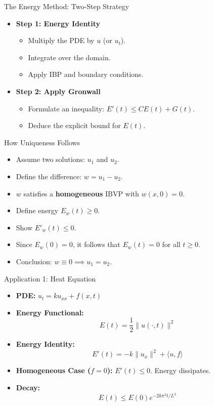 \documentclass{beamer}
\begin{document}
\begin{frame}{The Energy Method: Two-Step Strategy}
    \begin{itemize}[<+->]
        \item \textbf{Step 1: Energy Identity}
        \begin{itemize}
            \item Multiply the PDE by $u$ (or $u_t$).
            \item Integrate over the domain.
            \item Apply IBP and boundary conditions.
        \end{itemize}
        \vspace{0.3cm}
        \item \textbf{Step 2: Apply Gronwall}
        \begin{itemize}
            \item Formulate an inequality: $E'(t) \le C E(t) + G(t)$.
            \item Deduce the explicit bound for $E(t)$.
        \end{itemize}
    \end{itemize}
\end{frame}

\begin{frame}{How Uniqueness Follows}
    \begin{itemize}[<+->]
        \item Assume two solutions: $u_1$ and $u_2$.
        \item Define the difference: $w = u_1 - u_2$.
        \item $w$ satisfies a \textbf{homogeneous} IBVP with $w(x,0) = 0$.
        \item Define energy $E_w(t) \ge 0$.
        \item Show $E'_w(t) \le 0$.
        \item Since $E_w(0) = 0$, it follows that $E_w(t) = 0$ for all $t \ge 0$.
        \item Conclusion: $w \equiv 0 \implies u_1 = u_2$.
    \end{itemize}
\end{frame}

\begin{frame}{Application 1: Heat Equation}
    \begin{itemize}[<+->]
        \item \textbf{PDE:} $u_t = k u_{xx} + f(x,t)$
        \item \textbf{Energy Functional:} 
        \[ E(t) = \frac{1}{2} \|u(\cdot,t)\|^2 \]
        \item \textbf{Energy Identity:} 
        \[ E'(t) = -k\|u_x\|^2 + \langle u,f \rangle \]
        \item \textbf{Homogeneous Case ($f=0$):} $E'(t) \le 0$. Energy dissipates.
        \item \textbf{Decay:} 
        \[ E(t) \le E(0)e^{-2k\pi^2 t/L^2} \]
    \end{itemize}
\end{frame}
\end{document}
